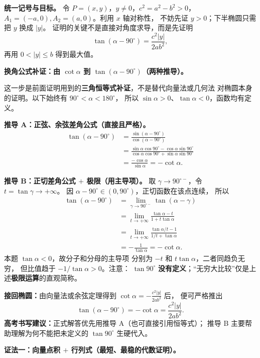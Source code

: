\begin{proofbox}
\textbf{统一记号与目标。}
令 $P=(x,y)$，$y\ne0$，$c^2=a^2-b^2>0$，
$A_1=(-a,0),A_2=(a,0)$。利用 $x$ 轴对称性，
不妨先证 $y>0$；下半椭圆只需把 $y$ 换成 $|y|$。
证明的关键不是直接对角度求导，而是先证明
\[
\boxed{\tan(\alpha-90^\circ)=\frac{c^2|y|}{2ab^2}},\tag{$*$}
\]
再用 $0<|y|\le b$ 得到最大值。

\medskip
\textbf{换角公式补证：由 $\cot\alpha$ 到 $\tan(\alpha-90^\circ)$（两种推导）。}

这一步是前面证明用到的\textbf{三角恒等式补证}，不是替代向量法或几何法
对椭圆本身的证明。以下始终有 $90^\circ<\alpha<180^\circ$，
所以 $\sin\alpha>0$、$\tan\alpha<0$，函数均有定义。

\textbf{推导 A：正弦、余弦差角公式（直接且严格）。}
\begin{align*}
\tan(\alpha-90^\circ)
&=\frac{\sin(\alpha-90^\circ)}{\cos(\alpha-90^\circ)}\\
&=\frac{\sin\alpha\cos90^\circ-\cos\alpha\sin90^\circ}
        {\cos\alpha\cos90^\circ+\sin\alpha\sin90^\circ}\\
&=\frac{-\cos\alpha}{\sin\alpha}
=\boxed{-\cot\alpha}.
\end{align*}

\textbf{推导 B：正切差角公式 $+$ 极限（用主导项）。}
取 $\gamma\to90^{\circ-}$，令 $t=\tan\gamma\to+\infty$。
因 $\alpha-90^\circ\in(0,90^\circ)$，正切函数在该点连续，
所以
\begin{align*}
\tan(\alpha-90^\circ)
&=\lim_{\gamma\to90^{\circ-}}\tan(\alpha-\gamma)\\
&=\lim_{t\to+\infty}\frac{\tan\alpha-t}{1+t\tan\alpha}\\
&=\lim_{t\to+\infty}
\frac{\tan\alpha/t-1}{1/t+\tan\alpha}\\
&=-\frac{1}{\tan\alpha}=\boxed{-\cot\alpha}.
\end{align*}
本题 $\tan\alpha<0$，故分子和分母的主导项
分别为 $-t$ 和 $t\tan\alpha$，二者同趋负无穷，
但比值趋于 $-1/\tan\alpha>0$。注意：
$\tan90^\circ$ \textbf{没有定义}；“无穷大比较”仅是上述\textbf{极限运算}的直观简称。

\textbf{接回椭圆：}由向量法或余弦定理得到
$\displaystyle\cot\alpha=-\frac{c^2|y|}{2ab^2}$ 后，
便可严格推出
\[
\tan(\alpha-90^\circ)=-\cot\alpha
=\frac{c^2|y|}{2ab^2}.
\]
\textbf{高考书写建议：}正式解答优先用推导 A（也可直接引用恒等式）；
推导 B 主要帮助理解为何不能把未定义的 $\tan90^\circ$ 生硬代入。

\medskip
\textbf{证法一：向量点积 $+$ 行列式（最短、最稳的代数证明）。}


\end{proofbox}
